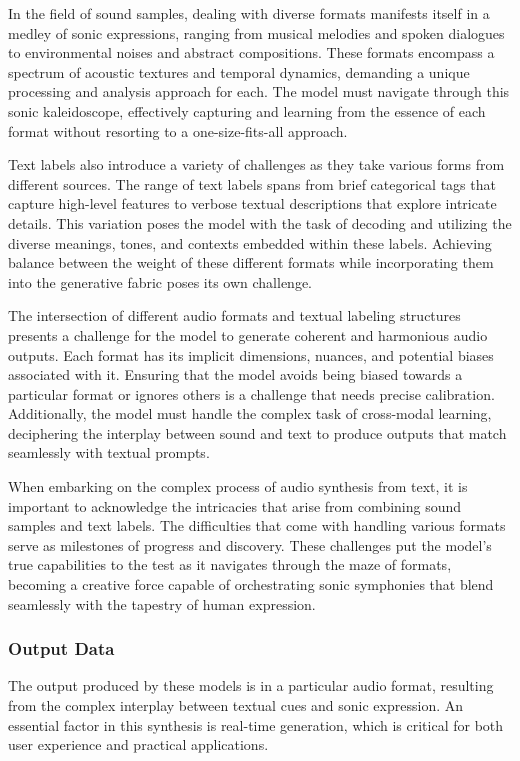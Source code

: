 In the field of sound samples, dealing with diverse formats manifests itself in a medley of sonic expressions, ranging from musical melodies and spoken dialogues to environmental noises and abstract compositions. These formats encompass a spectrum of acoustic textures and temporal dynamics, demanding a unique processing and analysis approach for each. The model must navigate through this sonic kaleidoscope, effectively capturing and learning from the essence of each format without resorting to a one-size-fits-all approach.

Text labels also introduce a variety of challenges as they take various forms from different sources. The range of text labels spans from brief categorical tags that capture high-level features to verbose textual descriptions that explore intricate details. This variation poses the model with the task of decoding and utilizing the diverse meanings, tones, and contexts embedded within these labels. Achieving balance between the weight of these different formats while incorporating them into the generative fabric poses its own challenge.

The intersection of different audio formats and textual labeling structures presents a challenge for the model to generate coherent and harmonious audio outputs. Each format has its implicit dimensions, nuances, and potential biases associated with it. Ensuring that the model avoids being biased towards a particular format or ignores others is a challenge that needs precise calibration. Additionally, the model must handle the complex task of cross-modal learning, deciphering the interplay between sound and text to produce outputs that match seamlessly with textual prompts.

When embarking on the complex process of audio synthesis from text, it is important to acknowledge the intricacies that arise from combining sound samples and text labels. The difficulties that come with handling various formats serve as milestones of progress and discovery. These challenges put the model's true capabilities to the test as it navigates through the maze of formats, becoming a creative force capable of orchestrating sonic symphonies that blend seamlessly with the tapestry of human expression.

\subsubsection{Output Data}

The output produced by these models is in a particular audio format, resulting from the complex interplay between textual cues and sonic expression. An essential factor in this synthesis is real-time generation, which is critical for both user experience and practical applications.

